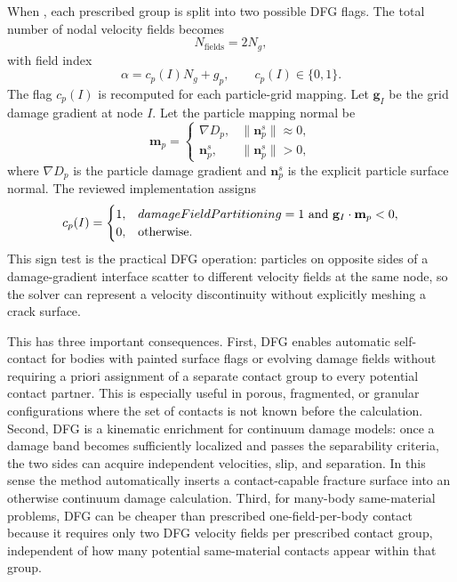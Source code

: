 When , each prescribed group is split into two possible DFG flags.  The total number of nodal velocity fields becomes
\begin{equation}
  N_{\mathrm{fields}}=2N_g,
\end{equation}
with field index
\begin{equation}
  \alpha = c_p(I)N_g + g_p, \qquad c_p(I)\in\{0,1\}.
  \label{eq:dfg-field-index}
\end{equation}
The flag $c_p(I)$ is recomputed for each particle-grid mapping.  Let $\mathbf{g}_I$ be the grid damage gradient at node $I$.  Let the particle mapping normal be
\begin{equation}
  \mathbf{m}_p =
  \begin{cases}
    \nabla D_p, & \|\mathbf{n}^s_p\|\approx 0,\\
    \mathbf{n}^s_p, & \|\mathbf{n}^s_p\|>0,
  \end{cases}
\end{equation}
where $\nabla D_p$ is the particle damage gradient and $\mathbf{n}^s_p$ is the explicit particle surface normal.  The reviewed implementation assigns
\begin{equation}
  c_p(I)=
  \begin{cases}
    1, & \mpmcode{damageFieldPartitioning}=1\ \hbox{and}\ \mathbf{g}_I\cdot\mathbf{m}_p < 0,\\
    0, & \hbox{otherwise}.
  \end{cases}
  \label{eq:dfg-contact-flag}
\end{equation}
This sign test is the practical DFG operation: particles on opposite sides of a damage-gradient interface scatter to different velocity fields at the same node, so the solver can represent a velocity discontinuity without explicitly meshing a crack surface.

This has three important consequences.  First, DFG enables automatic self-contact for bodies with painted surface flags or evolving damage fields without requiring a priori assignment of a separate contact group to every potential contact partner.  This is especially useful in porous, fragmented, or granular configurations where the set of contacts is not known before the calculation.  Second, DFG is a kinematic enrichment for continuum damage models: once a damage band becomes sufficiently localized and passes the separability criteria, the two sides can acquire independent velocities, slip, and separation.  In this sense the method automatically inserts a contact-capable fracture surface into an otherwise continuum damage calculation.  Third, for many-body same-material problems, DFG can be cheaper than prescribed one-field-per-body contact because it requires only two DFG velocity fields per prescribed contact group, independent of how many potential same-material contacts appear within that group.

